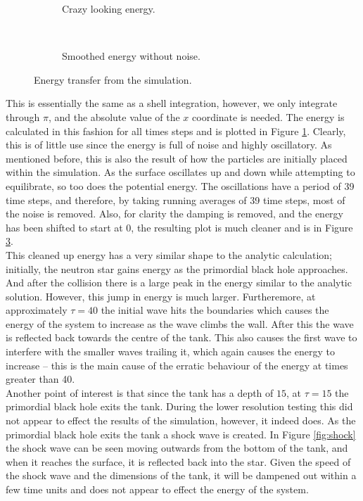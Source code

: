\begin{figure}
\centering
\begin{subfigure}{\textwidth}

\caption{Crazy looking energy.}
\label{fig:badenergy}
\end{subfigure} \\
\begin{subfigure}{\textwidth}

\caption{Smoothed energy without noise.}
\label{fig:goodenergy}
\end{subfigure}
\caption{Energy transfer from the simulation.}
\end{figure}

This is essentially the same as a shell integration, however, we only integrate through $\pi$, and the absolute value of the $x$ coordinate is needed. The energy is calculated in this fashion for all times steps and is plotted in Figure \ref{fig:badenergy}. Clearly, this is of little use since the energy is full of noise and highly oscillatory. As mentioned before, this is also the result of how the particles are initially placed within the simulation. As the surface oscillates up and down while attempting to equilibrate, so too does the potential energy. The oscillations have a period of 39 time steps, and therefore, by taking running averages of 39 time steps, most of the noise is removed. Also, for clarity the damping is removed, and the energy has been shifted to start at 0, the resulting plot is much cleaner and is in Figure \ref{fig:goodenergy}. \\

This cleaned up energy has a very similar shape to the analytic calculation; initially, the neutron star gains energy as the primordial black hole approaches. And after the collision there is a large peak in the energy similar to the analytic solution. However, this jump in energy is much larger. Furtheremore, at approximately $\tau = 40$ the initial wave hits the boundaries which causes the energy of the system to increase as the wave climbs the wall. After this the wave is reflected back towards the centre of the tank. This also causes the first wave to interfere with the smaller waves trailing it, which again causes the energy to increase -- this is the main cause of the erratic behaviour of the energy at times greater than 40. \\

Another point of interest is that since the tank has a depth of $15$, at $\tau = 15$ the primordial black hole exits the tank. During the lower resolution testing this did not appear to effect the results of the simulation, however, it indeed does. As the primordial black hole exits the tank a shock wave is created. In Figure \ref{fig:shock} the shock wave can be seen moving outwards from the bottom of the tank, and when it reaches the surface, it is reflected back into the star. Given the speed of the shock wave and the dimensions of the tank, it will be dampened out within a few time units and does not appear to effect the energy of the system.

